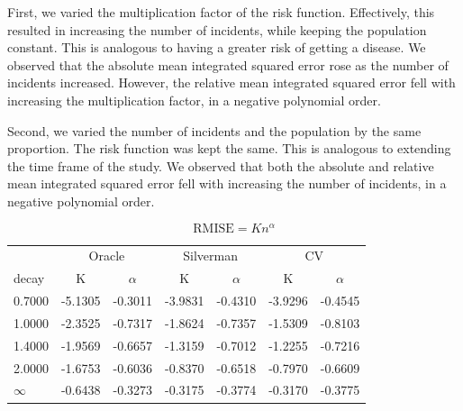 First, we varied the multiplication factor of the risk function.
Effectively, this resulted in increasing the number of incidents, while keeping the population constant.
This is analogous to having a greater risk of getting a disease.
We observed that the absolute mean integrated squared error rose as the number of incidents increased.
However, the relative mean integrated squared error fell with increasing the multiplication factor, in a negative polynomial order.

Second, we varied the number of incidents and the population by the same proportion.
The risk function was kept the same.
This is analogous to extending the time frame of the study.
We observed that both the absolute and relative mean integrated squared error fell with increasing the number of incidents, in a negative polynomial order.

\[
    \mbox{RMISE} = K n^{\alpha}
\]


\begin{table}[htbp]
\begin{tabular}{l*6c}
  \toprule
  & \multicolumn{2}{c}{Oracle} & \multicolumn{2}{c}{Silverman} & \multicolumn{2}{c}{CV} \\ 
  decay & K & \( \alpha \) & K & \( \alpha \) & K & \( \alpha \) \\ 
  \midrule
  0.7000 & -5.1305 & -0.3011 & -3.9831 & -0.4310 & -3.9296 & -0.4545 \\ 
  1.0000 & -2.3525 & -0.7317 & -1.8624 & -0.7357 & -1.5309 & -0.8103 \\ 
  1.4000 & -1.9569 & -0.6657 & -1.3159 & -0.7012 & -1.2255 & -0.7216 \\ 
  2.0000 & -1.6753 & -0.6036 & -0.8370 & -0.6518 & -0.7970 & -0.6609 \\ 
  \( \infty \) & -0.6438 & -0.3273 & -0.3175 & -0.3774 & -0.3170 & -0.3775 \\ 
  \bottomrule
\end{tabular}
\end{table}

